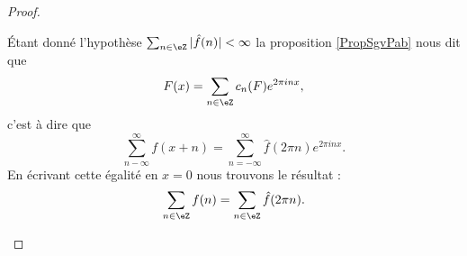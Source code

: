 \begin{proof}
\begin{subproof}
        Étant donné l'hypothèse \( \sum_{n\in \eZ}| \hat f(n) |<\infty\) la proposition \ref{PropSgvPab} nous dit que
        \begin{equation}
            F(x)=\sum_{n\in \eZ}c_n(F) e^{2\pi inx},
        \end{equation}
        c'est à dire que
        \begin{equation}
            \sum_{n-\infty}^{\infty}f(x+n)=\sum_{n=-\infty}^{\infty}\hat f(2\pi n) e^{2\pi i nx}.
        \end{equation}
        En écrivant cette égalité en \( x=0\) nous trouvons le résultat :
        \begin{equation}
            \sum_{n\in \eZ}f(n)=\sum_{n\in \eZ}\hat f(2\pi n).
        \end{equation}
    \end{subproof}
\end{proof}

